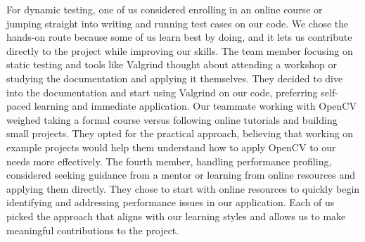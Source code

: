 \documentclass[12pt, titlepage]{article}
\begin{document}
\begin{enumerate}
  For dynamic testing, one of us considered enrolling in an online course or jumping straight into writing and running test cases on our code. We chose the hands-on route because some of us learn best by doing, and it lets us contribute directly to the project while improving our skills. The team member focusing on static testing and tools like Valgrind thought about attending a workshop or studying the documentation and applying it themselves. They decided to dive into the documentation and start using Valgrind on our code, preferring self-paced learning and immediate application. Our teammate working with OpenCV weighed taking a formal course versus following online tutorials and building small projects. They opted for the practical approach, believing that working on example projects would help them understand how to apply OpenCV to our needs more effectively. The fourth member, handling performance profiling, considered seeking guidance from a mentor or learning from online resources and applying them directly. They chose to start with online resources to quickly begin identifying and addressing performance issues in our application. Each of us picked the approach that aligns with our learning styles and allows us to make meaningful contributions to the project.
    
  \end{enumerate}

\printbibliography %
\end{document}
